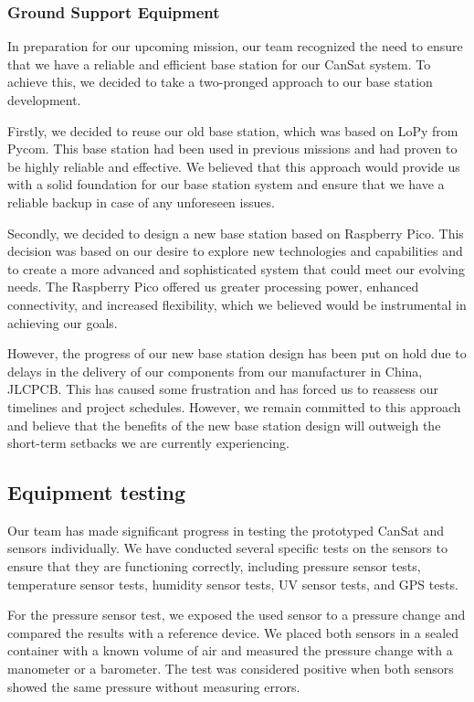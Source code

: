 \documentclass[11pt]{article}
\begin{document}
\subsubsection*{Ground Support Equipment}

In preparation for our upcoming mission, our team recognized the need to ensure that we have a reliable and efficient base station for our CanSat system. To achieve this, we decided to take a two-pronged approach to our base station development.

Firstly, we decided to reuse our old base station, which was based on LoPy from Pycom. This base station had been used in previous missions and had proven to be highly reliable and effective. We believed that this approach would provide us with a solid foundation for our base station system and ensure that we have a reliable backup in case of any unforeseen issues.

Secondly, we decided to design a new base station based on Raspberry Pico. This decision was based on our desire to explore new technologies and capabilities and to create a more advanced and sophisticated system that could meet our evolving needs. The Raspberry Pico offered us greater processing power, enhanced connectivity, and increased flexibility, which we believed would be instrumental in achieving our goals.

However, the progress of our new base station design has been put on hold due to delays in the delivery of our components from our manufacturer in China, JLCPCB. This has caused some frustration and has forced us to reassess our timelines and project schedules. However, we remain committed to this approach and believe that the benefits of the new base station design will outweigh the short-term setbacks we are currently experiencing.

\subsection*{Equipment testing}


Our team has made significant progress in testing the prototyped CanSat and sensors individually. We have conducted several specific tests on the sensors to ensure that they are functioning correctly, including pressure sensor tests, temperature sensor tests, humidity sensor tests, UV sensor tests, and GPS tests.

For the pressure sensor test, we exposed the used sensor to a pressure change and compared the results with a reference device. We placed both sensors in a sealed container with a known volume of air and measured the pressure change with a manometer or a barometer. The test was considered positive when both sensors showed the same pressure without measuring errors.
\end{document}
